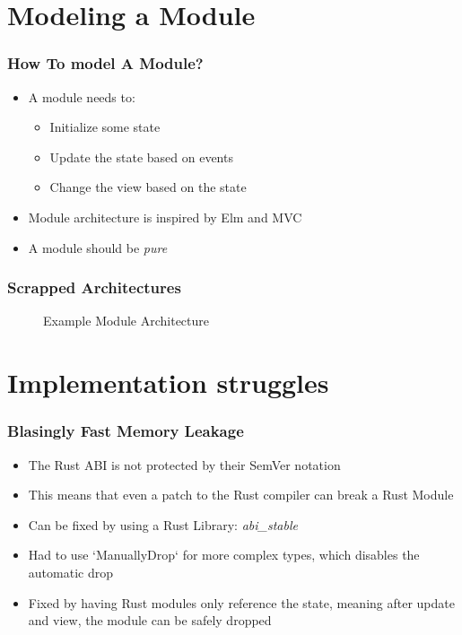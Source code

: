 \section{Modeling a Module}
\SectionPage

\begin{frame}
  \frametitle{How To model A Module?}
  \begin{itemize}
    \item A module needs to:
      \pause
      \begin{itemize}
        \item Initialize some state
        \pause
        \item Update the state based on events
        \pause
        \item Change the view based on the state
      \end{itemize}
      \pause
    \item Module architecture is inspired by Elm and MVC
      \pause
    \item A module should be \textit{pure}
  \end{itemize}
\end{frame}

\hidelogo

\begin{frame}
  \frametitle{Scrapped Architectures}
  \begin{figure}
    \centering
    
    \caption{Example Module Architecture}
    \label{fig:moduleArchitecture}
  \end{figure}
\end{frame}

\showlogo

\section{Implementation struggles}
\SectionPage

\begin{frame}
  \frametitle{Blasingly Fast Memory Leakage}
  \begin{itemize}
    \item The Rust ABI is not protected by their SemVer notation
      \pause
    \item This means that even a patch to the Rust compiler can break a
      Rust Module
      \pause
    \item Can be fixed by using a Rust Library: \textit{abi\_stable}
      \pause
    \item Had to use `ManuallyDrop` for more complex types, which disables
      the automatic drop
      \pause
    \item Fixed by having Rust modules only reference the state, meaning
      after update and view, the module can be safely dropped
  \end{itemize}
\end{frame}


